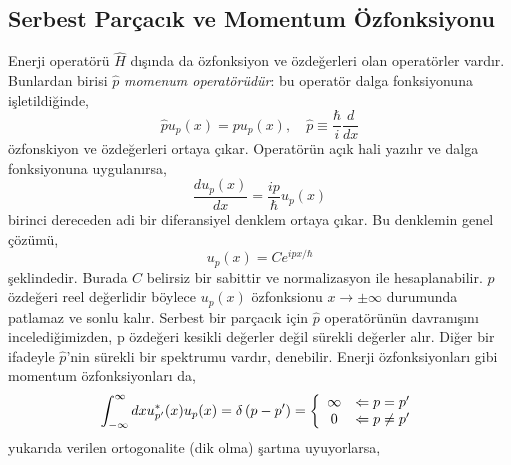 \documentclass[00_kitap.tex]{subfiles}
\begin{document}
\subsection{Serbest Parçacık ve Momentum Özfonksiyonu}

Enerji operatörü $\hat H$ dışında da özfonksiyon ve özdeğerleri olan operatörler vardır. Bunlardan birisi $\hat p$ \emph{momenum operatörüdür}: bu operatör dalga fonksiyonuna işletildiğinde,
\begin{equation}
\hat p u _ { p } ( x ) = p u _ { p } ( x ), \quad \hat p \equiv \frac{\hbar}{i} \frac{d}{dx}
\end{equation}
özfonskiyon ve özdeğerleri ortaya çıkar. Operatörün açık hali yazılır ve dalga fonksiyonuna uygulanırsa,
\begin{equation}
\frac { d u _ { p } ( x ) } { d x } = \frac { i p } { \hbar } u _ { p } ( x )
\end{equation}
birinci dereceden adi bir diferansiyel denklem ortaya çıkar. Bu denklemin genel çözümü,
\begin{equation}
u _ { p } ( x ) = C e ^ { i p x / \hbar }
\end{equation}
şeklindedir. Burada $C$ belirsiz bir sabittir ve normalizasyon ile hesaplanabilir. $p$ özdeğeri reel değerlidir böylece $u_p(x)$ özfonksionu $x \rightarrow \pm \infty$ durumunda patlamaz ve sonlu kalır. Serbest bir parçacık için $\hat p$ operatörünün davranışını incelediğimizden, p özdeğeri kesikli değerler değil sürekli değerler alır. Diğer bir ifadeyle $\hat p$'nin sürekli bir spektrumu vardır, denebilir. Enerji özfonksiyonları gibi momentum özfonksiyonları da,
\begin{equation}
\label{eq:dirac_norm}
\int _ { - \infty } ^ { \infty } d x u _ { p ^ { \prime } } ^ { * } ( x ) u _ { p } ( x ) = \delta \left( p - p ^ { \prime } \right)
 = \left\{
\begin{array} { c l } 
{ \infty } & { \Leftarrow p   =  p^\prime} \\
{ 0 } & { \Leftarrow p \neq p^\prime } 
\end{array} 
\right.
\end{equation}
yukarıda verilen ortogonalite (dik olma) şartına uyuyorlarsa,
\end{document}
